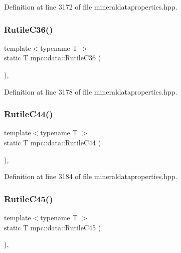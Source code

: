 Definition at line 3172 of file mineraldataproperties.\+hpp.

\mbox{\label{namespacempc_1_1data_a6e78b25df55c012aaf7b06a51d2e19a5}} 
\subsubsection{\texorpdfstring{Rutile\+C36()}{RutileC36()}}
{\footnotesize\ttfamily template$<$typename T $>$ \\
static T mpc\+::data\+::\+Rutile\+C36 (\begin{DoxyParamCaption}{ }\end{DoxyParamCaption})\hspace{0.3cm}{\ttfamily [inline]}, {\ttfamily [static]}}



Definition at line 3178 of file mineraldataproperties.\+hpp.

\mbox{\label{namespacempc_1_1data_a15ad086ad32c57f2b0a183fa5e2862a9}} 
\subsubsection{\texorpdfstring{Rutile\+C44()}{RutileC44()}}
{\footnotesize\ttfamily template$<$typename T $>$ \\
static T mpc\+::data\+::\+Rutile\+C44 (\begin{DoxyParamCaption}{ }\end{DoxyParamCaption})\hspace{0.3cm}{\ttfamily [inline]}, {\ttfamily [static]}}



Definition at line 3184 of file mineraldataproperties.\+hpp.

\mbox{\label{namespacempc_1_1data_a661875b8e0da7aaf617550f0e8372496}} 
\subsubsection{\texorpdfstring{Rutile\+C45()}{RutileC45()}}
{\footnotesize\ttfamily template$<$typename T $>$ \\
static T mpc\+::data\+::\+Rutile\+C45 (\begin{DoxyParamCaption}{ }\end{DoxyParamCaption})\hspace{0.3cm}{\ttfamily [inline]}, {\ttfamily [static]}}



